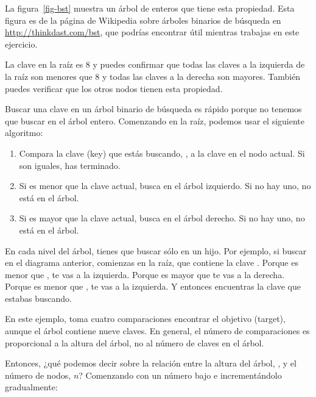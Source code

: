 \documentclass[12pt]{book}
\theoremstyle{exercise}
\begin{document}
La figura~\ref{fig-bst} muestra un árbol de enteros que tiene esta propiedad.
Esta figura es de la página de Wikipedia sobre árboles binarios de búsqueda en
\url{http://thinkdast.com/bst}, que podrías
encontrar útil mientras trabajas en este ejercicio.

La clave en la raíz es 8 y puedes confirmar que todas las claves a la izquierda
de la raíz son menores que 8 y todas las claves a la derecha son mayores.
También puedes verificar que los otros nodos tienen esta propiedad.


Buscar una clave en un árbol binario de búsqueda es rápido porque no tenemos
que buscar en el árbol entero. Comenzando en la raíz, podemos usar el
siguiente algoritmo:

\begin{enumerate}

\item
  Compara la clave (key) que estás buscando, , a la clave
  en el nodo actual. Si son iguales, has terminado.

\item
  Si  es menor que la clave actual, busca en el árbol izquierdo.
  Si no hay uno,  no está en el árbol.

\item
  Si  es mayor que la clave actual, busca en el árbol derecho.
  Si no hay uno,  no está en el árbol.

\end{enumerate}

En cada nivel del árbol, tienes que buscar sólo en un hijo. Por ejemplo,
si buscar  en el diagrama anterior, comienzas en la
raíz, que contiene la clave . Porque
 es menor que , te vas a la izquierda. Porque
 es mayor que  te vas a la derecha. Porque
 es menor que , te vas a la izquierda. Y entonces
encuentras la clave que estabas buscando.

En este ejemplo, toma cuatro comparaciones encontrar el objetivo (target),
aunque el árbol contiene nueve claves. En general, el número de
comparaciones es proporcional a la altura del árbol, no al número de
claves en el árbol.


Entonces, ¿qué podemos decir sobre la relación entre la altura del
árbol, , y el número de nodos, $n$? Comenzando con un número
bajo e incrementándolo gradualmente:
\end{document}
